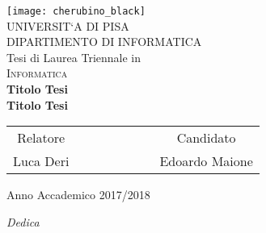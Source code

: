 \clearpage{\pagestyle{empty}\cleardoublepage}


\begin{titlepage}
 \begin{center}
     \texttt{[image: cherubino\_black]}\\
     \vspace{1em}
     {\Large \textsc{UNIVERSIT`A DI PISA}}\\
     \vspace{1em}
     {\Large \textsc{DIPARTIMENTO DI INFORMATICA}}\\
     \vspace{2em}
     {\normalsize Tesi di Laurea Triennale in}\\
     \vspace{1em}
     {\Large \textsc{Informatica}}\\
     \vspace{5em}
     {\LARGE \textbf{Titolo Tesi}}\\
     \vspace{1em}
     {\LARGE \textbf{Titolo Tesi}}\\
 \end{center}

\vskip 2.5cm
  \begin{center}
    \begin{tabular}{c c c c c c c c}
      Relatore & & & & & & & Candidato \\[0.2cm]
      \large{Luca Deri} & & & & & & & \large{Edoardo Maione}\\[0.4cm]
    \end{tabular}
  \end{center}

\vskip 2cm
\begin{center}
{\normalsize Anno Accademico 2017/2018}
\end{center}
\end{titlepage}

\clearpage{\pagestyle{empty}\cleardoublepage}


\vspace{5em}
\begin{flushright}
{\Large \textit{Dedica}}
\end{flushright}

\clearpage{\pagestyle{empty}\cleardoublepage}
